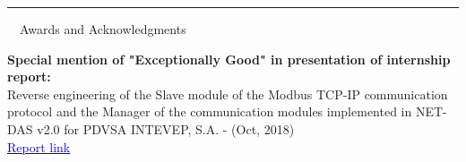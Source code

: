 \documentclass[a4paper,20pt]{article}
\makeatletter
\newcommand{\resumeItem}[2]{
  \item\small{
    \textbf{#1}{: #2 \vspace{-2pt}}
  }
}
\newcommand{\resumeSubheading}[4]{
  \vspace{-1pt}\item
    \begin{tabular*}{0.97\textwidth}{l@{\extracolsep{\fill}}r}
      \textbf{#1} & #2 \\
      \textit{#3} & \textit{#4} \\
    \end{tabular*}\vspace{-5pt}
}
\newcommand{\resumeSubItem}[2]{\resumeItem{#1}{#2}\vspace{-3pt}}
\newcommand{\resumeSubHeadingListStart}{\begin{itemize}[leftmargin=*]}
\newcommand{\resumeSubHeadingListEnd}{\end{itemize}}
\makeatother
\begin{document}



\vspace{10pt}
 \textcolor{NavyBlue}{ \rule[1mm]{2cm}{2mm} {\LARGE ~~Awards and Acknowledgments}}
\vspace{2pt}
\begin{description}[font=$\bullet$]
\item {\textbf{Special mention of "Exceptionally Good" in presentation of internship report:}}\\
 {Reverse engineering of the Slave module of the Modbus TCP-IP communication protocol and the Manager of the communication modules implemented in NET-DAS v2.0 for PDVSA INTEVEP, S.A. - (Oct, 2018)}\\
 \vspace{4pt}
 {{\href{https://drive.google.com/file/d/1bHQlD1dOGpO19o5fX3Z03ocKmDDeeF34/view}{\textcolor{Blue}{Report link}}}}
 

\end{description}


\end{document}

